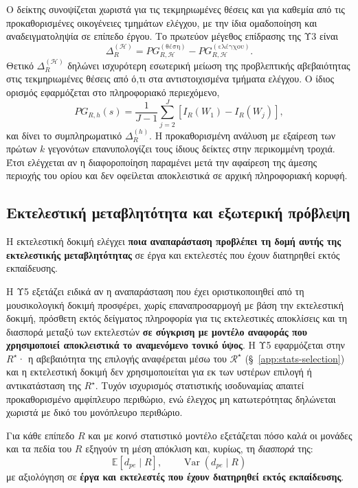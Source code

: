 \documentclass[11pt,a4paper]{article}
\begin{document}
Ο δείκτης συνοψίζεται χωριστά για τις τεκμηριωμένες θέσεις και για καθεμία από τις προκαθορισμένες οικογένειες τμημάτων ελέγχου, με την ίδια ομαδοποίηση και αναδειγματοληψία σε επίπεδο έργου. Το πρωτεύον μέγεθος επίδρασης της Υ3 είναι
\[
\Delta_R^{(\mathcal H)}=
PG_{R,\mathcal H}^{(\text{θέση})}-PG_{R,\mathcal H}^{(\text{ελέγχου})}.
\]
Θετικό \(\Delta_R^{(\mathcal H)}\) δηλώνει ισχυρότερη εσωτερική μείωση της προβλεπτικής αβεβαιότητας στις τεκμηριωμένες θέσεις από ό,τι στα αντιστοιχισμένα τμήματα ελέγχου. Ο ίδιος ορισμός εφαρμόζεται στο πληροφοριακό περιεχόμενο,
\[
PG_{R,h}(s)
=
\frac{1}{J-1}
\sum_{j=2}^{J}
\left[
I_R(W_1)-I_R(W_j)
\right],
\]
και δίνει το συμπληρωματικό \(\Delta_R^{(h)}\). Η προκαθορισμένη ανάλυση με εξαίρεση των πρώτων \(k\) γεγονότων επανυπολογίζει τους ίδιους δείκτες στην περικομμένη τροχιά. Έτσι ελέγχεται αν η διαφοροποίηση παραμένει μετά την αφαίρεση της άμεσης περιοχής του ορίου και δεν οφείλεται αποκλειστικά σε αρχική πληροφοριακή κορυφή.

\subsection{Εκτελεστική μεταβλητότητα και εξωτερική πρόβλεψη}\label{app:stats-performance}

Η εκτελεστική δοκιμή ελέγχει \textbf{ποια αναπαράσταση προβλέπει τη δομή αυτής της εκτελεστικής μεταβλητότητας} σε έργα και εκτελεστές που έχουν διατηρηθεί εκτός εκπαίδευσης.

Η Υ5 εξετάζει ειδικά αν η αναπαράσταση που έχει οριστικοποιηθεί από τη μουσικολογική δοκιμή προσφέρει, χωρίς επαναπροσαρμογή με βάση την εκτελεστική δοκιμή, πρόσθετη εκτός δείγματος πληροφορία για τις εκτελεστικές αποκλίσεις και τη διασπορά μεταξύ των εκτελεστών \textbf{σε σύγκριση με μοντέλο αναφοράς που χρησιμοποιεί αποκλειστικά το αναμενόμενο τονικό ύψος}. Η Υ5 εφαρμόζεται στην $R^\star$· η αβεβαιότητα της επιλογής αναφέρεται μέσω του $\mathcal R^\star$ (§~\ref{app:stats-selection}) και η εκτελεστική δοκιμή δεν χρησιμοποιείται για εκ των υστέρων επιλογή ή αντικατάσταση της $R^\star$. Τυχόν ισχυρισμός στατιστικής ισοδυναμίας απαιτεί προκαθορισμένο αμφίπλευρο περιθώριο, ενώ έλεγχος μη κατωτερότητας δηλώνεται χωριστά με δικό του μονόπλευρο περιθώριο.

Για κάθε επίπεδο \(R\) και με \emph{κοινό} στατιστικό μοντέλο εξετάζεται πόσο καλά οι μονάδες και τα πεδία του \(R\) εξηγούν τη μέση απόκλιση και, κυρίως, τη \emph{διασπορά} της:
\[
\mathbb{E}[d_{pe}\mid R],\qquad \operatorname{Var}(d_{pe}\mid R)
\]
με αξιολόγηση σε \textbf{έργα και εκτελεστές που έχουν διατηρηθεί εκτός εκπαίδευσης}.
\end{document}
